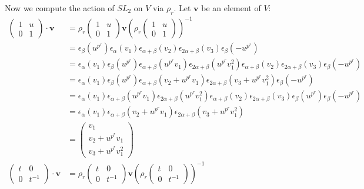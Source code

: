 Now we compute the action of $SL_2$ on $V$ via $\rho_r$. Let $\mathbf{v}$ be an element of $V$:
\begin{align*}
\left(\begin{matrix} 1 & u \\ 0 & 1\end{matrix}\right) \cdot \mathbf{v} &= \rho_r\left(\begin{matrix} 1 & u \\ 0 & 1\end{matrix}\right) \mathbf{v}\left( \rho_r\left(\begin{matrix} 1 & u \\ 0 & 1\end{matrix}\right)\right)^{-1} \\
&=\epsilon_\beta (u^{p^r}) \epsilon_\alpha (v_1)\epsilon_{\alpha+\beta}(v_2) \epsilon_{2\alpha+\beta}(v_3) \epsilon_\beta (-u^{p^r}) \\
&=\epsilon_\alpha (v_1) \epsilon_\beta (u^{p^r}) \epsilon_{\alpha+\beta}(u^{p^r}v_1) \epsilon_{2\alpha+\beta}(u^{p^r}v_1^2) \epsilon_{\alpha+\beta}(v_2) \epsilon_{2\alpha+\beta}(v_3) \epsilon_\beta (-u^{p^r})  \\
&=\epsilon_\alpha (v_1) \epsilon_\beta (u^{p^r}) \epsilon_{\alpha+\beta}(v_2 + u^{p^r}v_1) \epsilon_{2\alpha+\beta}(v_3 + u^{p^r}v_1^2)  \epsilon_\beta (-u^{p^r})  \\
&=\epsilon_\alpha (v_1) \epsilon_{\alpha+\beta}(u^{p^r}v_1) \epsilon_{2\alpha+\beta}(u^{p^r}v_1^2) \epsilon_{\alpha+\beta}(v_2) \epsilon_{2\alpha+\beta}(v_3)\epsilon_\beta (u^{p^r})  \epsilon_\beta (-u^{p^r})  \\
&=\epsilon_\alpha (v_1)  \epsilon_{\alpha+\beta}(v_2 + u^{p^r}v_1) \epsilon_{2\alpha+\beta}(v_3 + u^{p^r}v_1^2) \\
&= \left(\begin{matrix} v_1 \\ v_2 + u^{p^r}v_1\\ v_3 + u^{p^r}v_1^2 \end{matrix}\right)\\
\left(\begin{matrix} t & 0 \\ 0 & t^{-1}\end{matrix}\right) \cdot \mathbf{v} &=
\rho_r\left(\begin{matrix} t & 0 \\ 0 & t^{-1}\end{matrix}\right) \mathbf{v}\left( \rho_r\left(\begin{matrix} t & 0 \\ 0 & t^{-1}\end{matrix}\right)\right)^{-1} \\

\end{align*}
